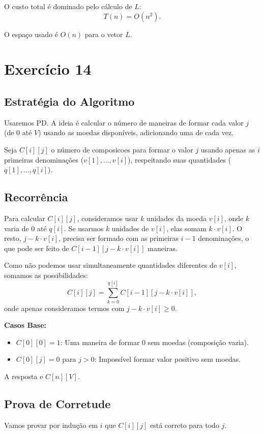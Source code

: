 \documentclass[a4paper,12pt]{article}
\begin{document}
O custo total é dominado pelo cálculo de $L$:
\begin{equation}
\boxed{T(n) = O(n^2)}.
\end{equation}

O espaço usado é $O(n)$ para o vetor $L$.

\section*{Exercício 14}

\subsection*{Estratégia do Algoritmo}
Usaremos PD. A ideia é calcular o número de maneiras de formar cada valor $j$ (de 0 até $V$) usando as moedas disponíveis, adicionando uma de cada vez.

Seja $C[i][j]$ o número de composicoes para formar o valor $j$ usando apenas as $i$ primeiras denominações ($v[1], \dots, v[i]$), respeitando suas quantidades ($q[1], \dots, q[i]$).

\subsection*{Recorrência}
Para calcular $C[i][j]$, consideramos usar $k$ unidades da moeda $v[i]$, onde $k$ varia de $0$ até $q[i]$. Se usarmos $k$ unidades de $v[i]$, elas somam $k \cdot v[i]$. O resto, $j - k \cdot v[i]$, precisa ser formado com as primeiras $i-1$ denominações, o que pode ser feito de $C[i-1][j - k \cdot v[i]]$ maneiras.

Como não podemos usar simultaneamente quantidades diferentes de $v[i]$, somamos as possibilidades:
\begin{equation}
C[i][j] = \sum_{k=0}^{q[i]} C[i-1][j - k \cdot v[i]],
\end{equation}
onde apenas consideramos termos com $j - k \cdot v[i] \ge 0$.

\textbf{Casos Base:}
\begin{itemize}
    \item $C[0][0] = 1$: Uma maneira de formar 0 sem moedas (composição vazia).
    \item $C[0][j] = 0$ para $j > 0$: Impossível formar valor positivo sem moedas.
\end{itemize}

A resposta e $C[n][V]$.
\subsection*{Prova de Corretude}
Vamos provar por indução em $i$ que $C[i][j]$ está correto para todo $j$.
\end{document}

